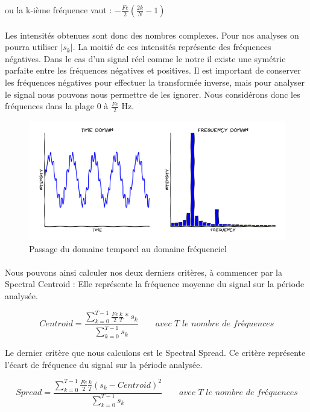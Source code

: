 \documentclass[soumission]{ir}
\begin{document}
ou la k-ième fréquence vaut : $-\frac{Fe}{2} (\frac{2k}{N} - 1)$

\paragraph{}
Les intensités obtenues sont donc des nombres complexes. Pour nos analyses on pourra utiliser $|s_k|$. La 
moitié de ces intensités représente des fréquences négatives. Dans le cas d'un signal réel comme le notre 
il existe une symétrie parfaite entre les fréquences négatives et positives. Il est important de conserver 
les fréquences négatives pour effectuer la transformée inverse, mais pour analyser le signal nous pouvons 
nous permettre de les ignorer. Nous considérons donc les fréquences dans la plage 0 à $\frac{Fe}{2}$ Hz.

\begin{figure}[ht]
    \includegraphics[scale=0.7]{images/Fourier.png}
    \caption{Passage du domaine temporel au domaine fréquenciel}
\end{figure}

\paragraph{}
Nous pouvons ainsi calculer nos deux derniers critères, à commencer par la Spectral Centroid : Elle représente la 
fréquence moyenne du signal sur la période analysée.

\begin{equation}
    Centroid = \frac{ \sum_{k = 0}^{T-1} \frac{Fe}{2} \frac{k}{T} * s_k}{\sum_{k=0}^{T-1} s_k}
    \qquad \textit{avec T le nombre de fréquences}
\end{equation}

Le dernier critère que nous calculons est le Spectral Spread. Ce critère représente l'écart de fréquence du
signal sur la période analysée.

\begin{equation}
    Spread = \frac{ \sum_{k = 0}^{T-1} \frac{Fe}{2} \frac{k}{T} (s_k - Centroid)^2}{\sum_{k=0}^{T-1} s_k}
    \qquad \textit{avec T le nombre de fréquences}
\end{equation}
\end{document}

